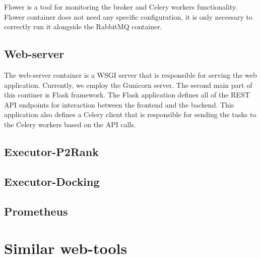 Flower is a tool for monitoring the broker and Celery workers functionality. Flower container does not need any specific configuration, it is only necessary to correctly run it alongside the RabbitMQ container. 

\subsection{Web-server}

The web-server container is a WSGI server that is responsible for serving the web application. Currently, we employ the Gunicorn server. The second main part of this continer is Flask framework. The Flask application defines all of the REST API endpoints for interaction between the frontend and the backend. This application also defines a Celery client that is responsible for sending the tasks to the Celery workers based on the API calls.


\subsection{Executor-P2Rank}


\subsection{Executor-Docking}


\subsection{Prometheus}



\section{Similar web-tools}

